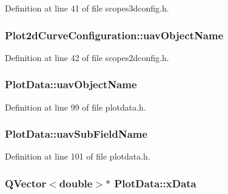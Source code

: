 Definition at line 41 of file scopes3dconfig.\-h.

\hypertarget{group___scope_plugin_gaf7c7f2da1da17096fbffa1fdaa35d30e}{
\subsubsection[{uav\-Object\-Name}]{ Plot2d\-Curve\-Configuration\-::uav\-Object\-Name}}\label{group___scope_plugin_gaf7c7f2da1da17096fbffa1fdaa35d30e}


Definition at line 42 of file scopes2dconfig.\-h.

\hypertarget{group___scope_plugin_ga409edd318f86291f5b46a673ff67e7fb}{
\subsubsection[{uav\-Object\-Name}]{ Plot\-Data\-::uav\-Object\-Name\hspace{0.3cm}{\ttfamily [protected]}}}\label{group___scope_plugin_ga409edd318f86291f5b46a673ff67e7fb}


Definition at line 99 of file plotdata.\-h.

\hypertarget{group___scope_plugin_ga22ac4a688fa35def44e941b82b0a0b60}{
\subsubsection[{uav\-Sub\-Field\-Name}]{ Plot\-Data\-::uav\-Sub\-Field\-Name\hspace{0.3cm}{\ttfamily [protected]}}}\label{group___scope_plugin_ga22ac4a688fa35def44e941b82b0a0b60}


Definition at line 101 of file plotdata.\-h.

\hypertarget{group___scope_plugin_ga6232b3f635142b1b11f283491a01b719}{
\subsubsection[{x\-Data}]{\setlength{\rightskip}{0pt plus 5cm}Q\-Vector$<${\bf double}$>$$\ast$ Plot\-Data\-::x\-Data\hspace{0.3cm}{\ttfamily [protected]}}}\label{group___scope_plugin_ga6232b3f635142b1b11f283491a01b719}


